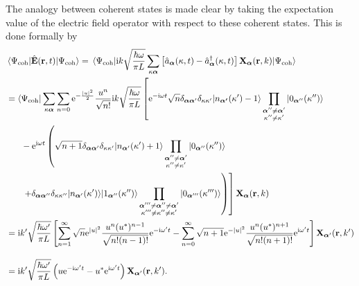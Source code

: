 \documentclass{article}
\numberwithin{equation}{section}
\begin{document}
The analogy between coherent states is made clear by taking the expectation value of the electric field operator with respect to these coherent states. This is done formally by
\begin{equation}
\begin{split}
&\mel{\Psi_\mathrm{coh}}{\hat{\mathbf{E}}(\mathbf{r},t)}{\Psi_\mathrm{coh}} = \mel{\Psi_\mathrm{coh}}{\mathrm{i} k\sqrt{\frac{\hbar\omega}{\pi L}}\sum_{\kappa\bm{\alpha}}\left[\hat{a}_{\bm{\alpha}}(\kappa,t) - \hat{a}_{\bm{\alpha}}^\dagger(\kappa,t)\right]\mathbf{X}_{\bm{\alpha}}(\mathbf{r},k)}{\Psi_\mathrm{coh}}\\
&= \bra{\Psi_\mathrm{coh}}\sum_{\kappa\bm{\alpha}}\sum_{n = 0}\mathrm{e}^{-\frac{|u|^2}{2}}\frac{u^n}{\sqrt{n!}}\mathrm{i}k\sqrt{\frac{\hbar\omega}{\pi L}}\left[\mathrm{e}^{-\mathrm{i}\omega t}\sqrt{n}\delta_{\bm{\alpha}\bm{\alpha}'}\delta_{\kappa\kappa'}\ket{n_{\bm{\alpha'}}(\kappa') - 1}\prod_{\substack{\bm{\alpha}''\neq\bm{\alpha}'\\\kappa''\neq\kappa'}}\ket{0_{\bm{\alpha}''}(\kappa'')}\right.\\
&\hspace{0.05\textwidth}- \mathrm{e}^{\mathrm{i}\omega t}\left(\sqrt{n + 1}\delta_{\bm{\alpha}\bm{\alpha}'}\delta_{\kappa\kappa'}\ket{n_{\bm{\alpha}'}(\kappa') + 1}\prod_{\substack{\bm{\alpha}''\neq\bm{\alpha}'\\\kappa''\neq\kappa'}}\ket{0_{\bm{\alpha}''}(\kappa'')}\right.\\
&\hspace{0.05\textwidth}\left.\left.+ \delta_{\bm{\alpha}\bm{\alpha}''}\delta_{\kappa\kappa''}\ket{n_{\bm{\alpha}'}(\kappa')}\ket{1_{\bm{\alpha}''}(\kappa'')}\prod_{\substack{\bm{\alpha}'''\neq\bm{\alpha}''\neq\bm{\alpha}'\\\kappa'''\neq\kappa''\neq\kappa'}}\ket{0_{\bm{\alpha}'''}(\kappa''')}\right)\right]\mathbf{X}_{\bm{\alpha}}(\mathbf{r},k)\\
&= \mathrm{i}k'\sqrt{\frac{\hbar\omega'}{\pi L}}\left[\sum_{n=1}^\infty\sqrt{n}\mathrm{e}^{|u|^2}\frac{u^n(u^*)^{n-1}}{\sqrt{n!(n-1)!}}\mathrm{e}^{-\mathrm{i}\omega' t} - \sum_{n = 0}^\infty\sqrt{n+1}\mathrm{e}^{-|u|^2}\frac{u^n(u^*)^{n+1}}{\sqrt{n!(n+1)!}}\mathrm{e}^{\mathrm{i}\omega' t}\right]\mathbf{X}_{\bm{\alpha}'}(\mathbf{r},k')\\[1.0em]
&= \mathrm{i}k'\sqrt{\frac{\hbar\omega'}{\pi L}}\left(u\mathrm{e}^{-\mathrm{i}\omega't} - u^*\mathrm{e}^{\mathrm{i}\omega't}\right)\mathbf{X}_{\bm{\alpha}'}(\mathbf{r},k').
\end{split}
\end{equation}
\end{document}
